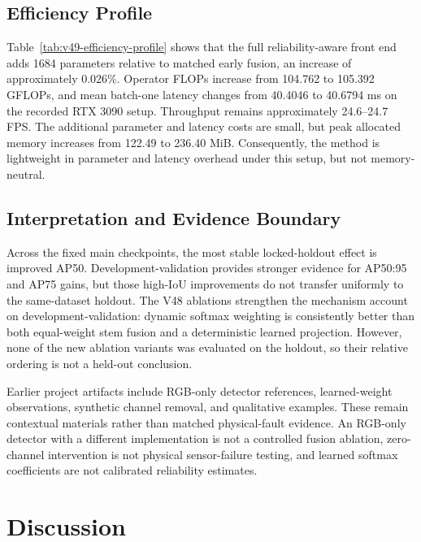 

\subsection{Efficiency Profile}

Table~\ref{tab:v49-efficiency-profile} shows that the full reliability-aware front end adds 1684 parameters relative to matched early fusion, an increase of approximately 0.026\%. Operator FLOPs increase from 104.762 to 105.392 GFLOPs, and mean batch-one latency changes from 40.4046 to 40.6794 ms on the recorded RTX 3090 setup. Throughput remains approximately 24.6--24.7 FPS. The additional parameter and latency costs are small, but peak allocated memory increases from 122.49 to 236.40 MiB. Consequently, the method is lightweight in parameter and latency overhead under this setup, but not memory-neutral.



\subsection{Interpretation and Evidence Boundary}

Across the fixed main checkpoints, the most stable locked-holdout effect is improved AP50. Development-validation provides stronger evidence for AP50:95 and AP75 gains, but those high-IoU improvements do not transfer uniformly to the same-dataset holdout. The V48 ablations strengthen the mechanism account on development-validation: dynamic softmax weighting is consistently better than both equal-weight stem fusion and a deterministic learned projection. However, none of the new ablation variants was evaluated on the holdout, so their relative ordering is not a held-out conclusion.

Earlier project artifacts include RGB-only detector references, learned-weight observations, synthetic channel removal, and qualitative examples. These remain contextual materials rather than matched physical-fault evidence. An RGB-only detector with a different implementation is not a controlled fusion ablation, zero-channel intervention is not physical sensor-failure testing, and learned softmax coefficients are not calibrated reliability estimates.

\section{Discussion}

